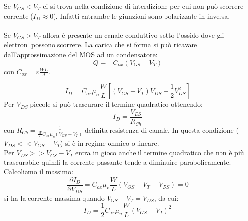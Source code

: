 \documentclass{article}
\begin{document}
Se $V_{GS} < V_T$ ci si trova nella condizione di interdizione per cui non può scorrere corrente ($I_D \approx 0$). Infatti entrambe le giunzioni sono polarizzate in inversa.\\
\\
Se $V_{GS} > V_T$ allora è presente un canale conduttivo sotto l'ossido dove gli elettroni possono scorrere. La carica che si forma si può ricavare dall'approssimazione del MOS ad un condensatore:
\begin{equation*}
Q = -C_{ox} (V_{GS} - V_T)
\end{equation*}
con $C_{ox} = \varepsilon \frac{WL}{d}$.

\begin{equation}	\label{eq:corrente_ch}
I_D = C_{ox} \mu_n \frac{W}{L} \left[ (V_{GS} - V_T)V_{DS} - \frac{1}{2}V_{DS}^2 \right]
\end{equation}
Per $V_{DS}$ piccole si può trascurare il termine quadratico ottenendo:
\begin{equation*}
I_D = \frac{V_{DS}}{R_{Ch}}
\end{equation*}
con $R_{Ch} = \frac{1}{\frac{W}{L} C_{ox} \mu_n (V_{GS} - V_T)}$  definita resistenza di canale. In questa condizione ($V_{DS} << V_{GS} - V_T$) si è in regime ohmico o lineare.\\
Per $V_{DS} >> V_{GS} - V_T$ entra in gioco anche il termine quadratico che non è più trascurabile quindi la corrente passante tende a diminuire parabolicamente. Calcoliamo il massimo:
\begin{equation*}
\frac{\partial I_D}{ \partial V_{DS}} = C_{ox} \mu_n \frac{W}{L} (V_{GS} - V_T - V_{DS}) = 0
\end{equation*}
si ha la corrente massima quando $V_{GS} - V_T = V_{DS}$, da cui:
\begin{equation}	\label{eq:corrente_sat}
I_D = \frac{1}{2} C_{ox} \mu_n \frac{W}{L} (V_{GS} - V_T)^2
\end{equation}
\end{document}
